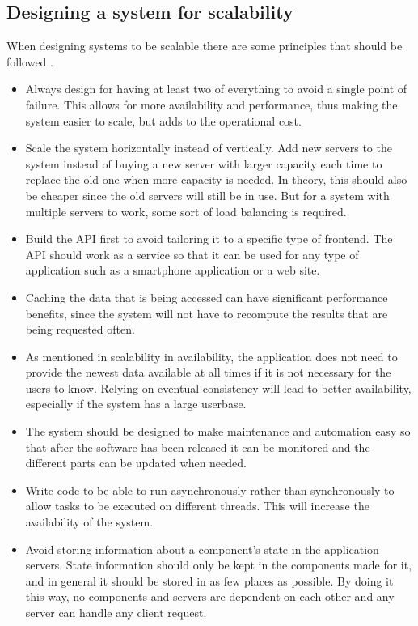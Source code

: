 \subsection{Designing a system for scalability}
When designing systems to be scalable there are some principles that should be followed \cite{ScalabilityDesignPrinciples}.
\begin{itemize}
    \item Always design for having at least two of everything to avoid a single point of failure. This allows for more availability and performance, thus making the system easier to scale, but adds to the operational cost.
    \item Scale the system horizontally instead of vertically. Add new servers to the system instead of buying a new server with larger capacity each time to replace the old one when more capacity is needed. In theory, this should also be cheaper since the old servers will still be in use. But for a system with multiple servers to work, some sort of load balancing is required.
    \item Build the API first to avoid tailoring it to a specific type of frontend. The API should work as a service so that it can be used for any type of application such as a smartphone application or a web site. 
    \item Caching the data that is being accessed can have significant performance benefits, since the system will not have to recompute the results that are being requested often. 
    \item As mentioned in scalability in availability, the application does not need to provide the newest data available at all times if it is not necessary for the users to know. Relying on eventual consistency will lead to better availability, especially if the system has a large userbase.
    \item The system should be designed to make maintenance and automation easy so that after the software has been released it can be monitored and the different parts can be updated when needed.
    \item Write code to be able to run asynchronously rather than synchronously to allow tasks to be executed on different threads. This will increase the availability of the system.
    \item Avoid storing information about a component's state in the application servers. State information should only be kept in the components made for it, and in general it should be stored in as few places as possible. By doing it this way, no components and servers are dependent on each other and any server can handle any client request. 
\end{itemize}